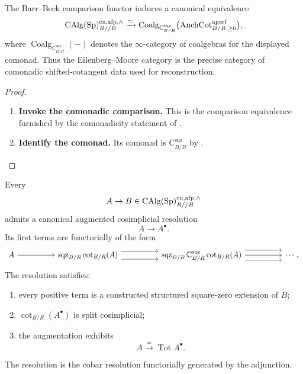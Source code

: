 \begin{corollary}
\label{cor:cotangent-square-zero-coalgebra-classification}
The Barr--Beck comparison functor induces a canonical equivalence
\[
    \operatorname{CAlg}(\operatorname{Sp})^{\mathrm{cn},\mathrm{afp},\wedge}_{R//B}
    \xrightarrow{\simeq}
    \operatorname{Coalg}_{\mathbb C^{\mathrm{sqz}}_{B/R}}
    \bigl(
        \operatorname{AnchCot}^{\mathrm{aperf}}_{B/R,\geq0}
    \bigr),
\]
where \(\operatorname{Coalg}_{\mathbb C^{\mathrm{sqz}}_{B/R}}(-)\) denotes
the \(\infty\)-category of coalgebras for the displayed comonad. Thus the Eilenberg--Moore category is the precise category of comonadic
shifted-cotangent data used for reconstruction.
\end{corollary}

\begin{proof}
\leavevmode
\begin{enumerate}[label=\textup{(\arabic*)}]
    \item \textbf{Invoke the comonadic comparison.}
    This is the comparison equivalence furnished by the comonadicity statement of
    .
    \item \textbf{Identify the comonad.}
    Its comonad is
    \(\mathbb C^{\mathrm{sqz}}_{B/R}\) by
    .
\end{enumerate}
\end{proof}

\begin{corollary}
\label{cor:canonical-square-zero-cobar-resolution}
Every
\[
    A\to B
    \in
    \operatorname{CAlg}(\operatorname{Sp})^{\mathrm{cn},\mathrm{afp},\wedge}_{R//B}
\]
admits a canonical augmented cosimplicial resolution
\[
    A\longrightarrow A^\bullet.
\]
Its first terms are functorially of the form
\[
\begin{tikzcd}[column sep=huge]
    A \arrow[r]
        &
    \operatorname{sqz}_{B/R}\operatorname{cot}_{B/R}(A)
        \arrow[r,shift left=1.2ex]
        \arrow[r,shift right=1.2ex]
        &
    \operatorname{sqz}_{B/R}
    \mathbb C^{\mathrm{sqz}}_{B/R}
    \operatorname{cot}_{B/R}(A)
        \arrow[r,shift left=1.5ex]
        \arrow[r]
        \arrow[r,shift right=1.5ex]
        &
    \cdots ,
\end{tikzcd}
\]
The resolution satisfies:
\begin{enumerate}[label=(\roman*)]
    \item every positive term is a constructed structured square-zero
    extension of \(B\);
    \item \(\operatorname{cot}_{B/R}(A^\bullet)\) is split cosimplicial;
    \item the augmentation exhibits
    \[
        A\xrightarrow{\simeq}\operatorname*{Tot}A^\bullet.
    \]
\end{enumerate}
The resolution is the cobar resolution functorially generated by the
adjunction.
\end{corollary}

